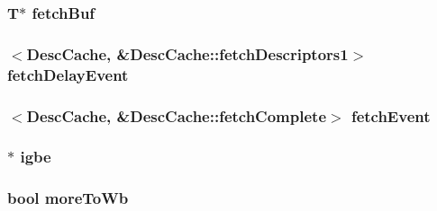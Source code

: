 \label{classIGbE_1_1DescCache_adf659db1aecba7384fa82d960d89d602}
\hypertarget{classIGbE_1_1DescCache_a45bfe33ba83d15f61fe3f115d779717e}{
\subsubsection[{fetchBuf}]{\setlength{\rightskip}{0pt plus 5cm}T$\ast$ {\bf fetchBuf}}}
\label{classIGbE_1_1DescCache_a45bfe33ba83d15f61fe3f115d779717e}
\hypertarget{classIGbE_1_1DescCache_a31cb5aa7ad676c587a8b467dfd762b9b}{
\subsubsection[{fetchDelayEvent}]{$<${\bf DescCache}, \&DescCache::fetchDescriptors1$>$ {\bf fetchDelayEvent}}}
\label{classIGbE_1_1DescCache_a31cb5aa7ad676c587a8b467dfd762b9b}
\hypertarget{classIGbE_1_1DescCache_a663aeb25d4224f8d4cbe8d4e1fe3d7d3}{
\subsubsection[{fetchEvent}]{$<${\bf DescCache}, \&DescCache::fetchComplete$>$ {\bf fetchEvent}}}
\label{classIGbE_1_1DescCache_a663aeb25d4224f8d4cbe8d4e1fe3d7d3}
\hypertarget{classIGbE_1_1DescCache_a408e72fda9473efd272ef36a9f6d6928}{
\subsubsection[{igbe}]{$\ast$ {\bf igbe}}}
\label{classIGbE_1_1DescCache_a408e72fda9473efd272ef36a9f6d6928}
\hypertarget{classIGbE_1_1DescCache_adf55798327cfefd75a5db0a6e71009e6}{
\subsubsection[{moreToWb}]{\setlength{\rightskip}{0pt plus 5cm}bool {\bf moreToWb}}}

